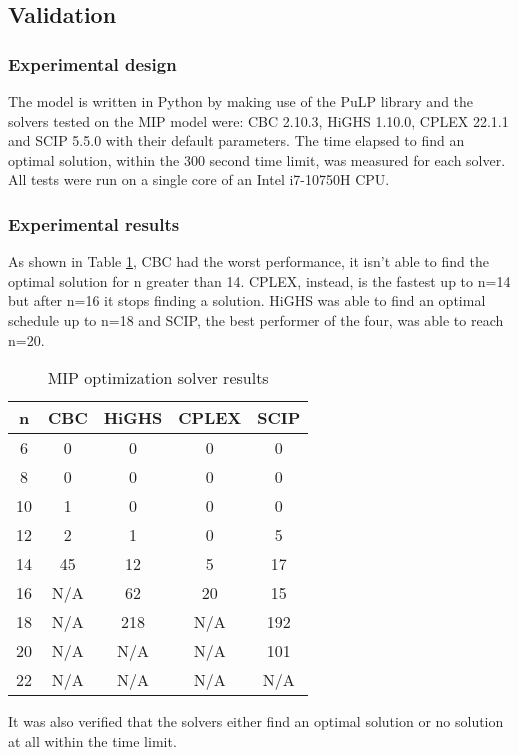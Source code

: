 \subsection{Validation}
\subsubsection*{Experimental design}
The model is written in Python by making use of the PuLP library and the solvers tested on the MIP model were: CBC 2.10.3, HiGHS 1.10.0, CPLEX 22.1.1 and SCIP 5.5.0 with their default parameters. The time elapsed to find an optimal solution, within the 300 second time limit, was measured for each solver. All tests were run on a single core of an Intel i7-10750H CPU.

\subsubsection*{Experimental results}
As shown in Table \ref{table:mip-results}, CBC had the worst performance, it isn't able to find the optimal solution for n greater than 14. CPLEX, instead, is the fastest up to n=14 but after n=16 it stops finding a solution. HiGHS was able to find an optimal schedule up to n=18 and SCIP, the best performer of the four, was able to reach n=20.

\begin{table}[htbp]
\centering
\small
{%
\begin{tabular}{|c|c|c|c|c|}
\toprule
\textbf{n} & \textbf{CBC} &\textbf{HiGHS} & \textbf{CPLEX} & \textbf{SCIP} \\
\midrule
6 & 0 & 0 & 0 & 0 \\
8 & 0 & 0 & 0 & 0 \\
10 & 1 & 0 & 0 & 0 \\
12 & 2 & 1 & 0 & 5 \\
14 & 45 & 12 & 5 & 17\\
16 & N/A & 62 & 20 & 15\\
18 & N/A & 218 & N/A & 192\\
20 & N/A & N/A & N/A & 101\\
22 & N/A & N/A & N/A & N/A\\
\bottomrule
\end{tabular}
}
\caption{MIP optimization solver results}
\label{table:mip-results}
\end{table}

It was also verified that the solvers either find an optimal solution or no solution at all within the time limit.